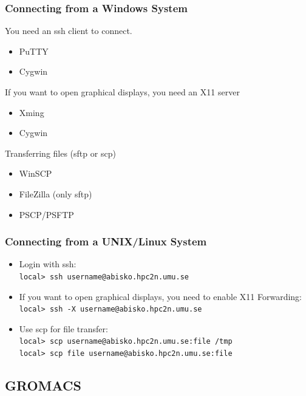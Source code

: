 \begin{frame}
	\frametitle{Connecting from a Windows System}

	You need an ssh client to connect.
	\begin{itemize}
		\item	PuTTY
		\item	Cygwin
	\end{itemize}

	If you want to open graphical displays, you need an X11 server
	\begin{itemize}
		\item	Xming
		\item	Cygwin
	\end{itemize}

	Transferring files (sftp or scp)
	\begin{itemize}
		\item	WinSCP
		\item	FileZilla (only sftp)
		\item	PSCP/PSFTP
	\end{itemize}

\end{frame}

\begin{frame}
	\frametitle{Connecting from a UNIX/Linux System}

	\begin{itemize}
		\item	Login with ssh:\\
		 \texttt{local> ssh username@abisko.hpc2n.umu.se}
		\item	If you want to open graphical displays, you need
				to enable X11 Forwarding:\\
		 \texttt{local> ssh -X username@abisko.hpc2n.umu.se}
		\item	Use scp for file transfer:\\
		 \texttt{local> scp username@abisko.hpc2n.umu.se:file /tmp}\\
		 \texttt{local> scp file username@abisko.hpc2n.umu.se:file}
	\end{itemize}

\end{frame}

\subsection{GROMACS}

